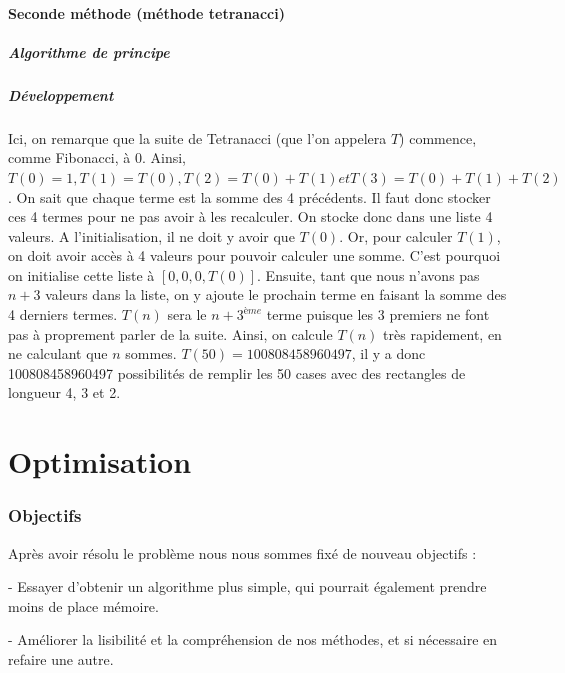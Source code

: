 \documentclass{article}
\begin{document}
\subsection{Seconde méthode (méthode tetranacci)}

\subsubsection{Algorithme de principe}


\subsubsection{Développement}
Ici, on remarque que la suite de Tetranacci (que l'on appelera $T$) commence, comme Fibonacci, à 0. Ainsi, $T(0) = 1, T(1) = T(0), T(2) = T(0) + T(1) et T(3) = T(0) + T(1) + T(2)$. On sait que chaque terme est la somme des 4 précédents. Il faut donc stocker ces 4 termes pour ne pas avoir à les recalculer. On stocke donc dans une liste 4 valeurs. A l'initialisation, il ne doit y avoir que $T(0)$. Or, pour calculer $T(1)$, on doit avoir accès à 4 valeurs pour pouvoir calculer une somme. C'est pourquoi on initialise cette liste à $[0,0,0,T(0)]$. Ensuite, tant que nous n'avons pas $n+3$ valeurs dans la liste, on y ajoute le prochain terme en faisant la somme des 4 derniers termes. $T(n)$ sera le $n+3^{ème}$ terme puisque les 3 premiers ne font pas à proprement parler de la suite. Ainsi, on calcule $T(n)$ très rapidement, en ne calculant que $n$ sommes. $T(50) = 100808458960497$, il y a donc 100808458960497 possibilités de remplir les 50 cases avec des rectangles de longueur 4, 3 et 2.

\newpage
\part {Optimisation}
\section {Objectifs}

Après avoir résolu le problème nous nous sommes fixé de nouveau objectifs :

\noindent - Essayer d'obtenir un algorithme plus simple, qui pourrait également prendre moins de place mémoire.

\noindent - Améliorer la lisibilité et la compréhension de nos méthodes, et si nécessaire en refaire une autre.
\end{document}
